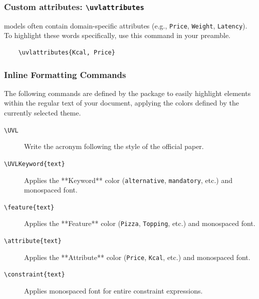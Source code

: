 \subsubsection{Custom attributes: \texttt{\textbackslash uvlattributes}}
\UVL models often contain domain-specific attributes (e.g., \texttt{Price}, \texttt{Weight}, \texttt{Latency}). To highlight these words specifically, use this command in your preamble.

\begin{verbatim}
    \uvlattributes{Kcal, Price}
\end{verbatim}


\subsubsection{Inline Formatting Commands}
The following commands are defined by the package to easily highlight \UVL elements within the regular text of your document, applying the colors defined by the currently selected theme.

\begin{description}
    \item[\texttt{\textbackslash UVL}] Write the acronym \UVL following the style of the official paper.
    \item[\texttt{\textbackslash UVLKeyword\{text\}}] Applies the **Keyword** color (\texttt{alternative}, \texttt{mandatory}, etc.) and monospaced font.
    \item[\texttt{\textbackslash feature\{text\}}] Applies the **Feature** color (\texttt{Pizza}, \texttt{Topping}, etc.) and monospaced font.
    \item[\texttt{\textbackslash attribute\{text\}}] Applies the **Attribute** color (\texttt{Price}, \texttt{Kcal}, etc.) and monospaced font.
    \item[\texttt{\textbackslash constraint\{text\}}] Applies monospaced font for entire constraint expressions.
\end{description}

